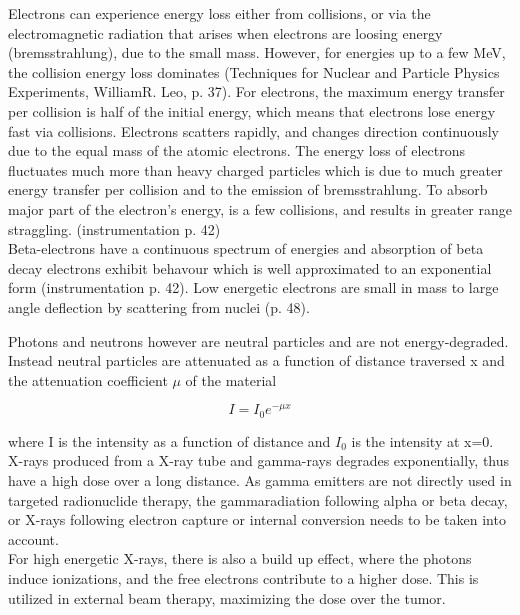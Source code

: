 \documentclass[a4paper,11pt,twoside]{book}
\begin{document}
Electrons can experience energy loss either  from  collisions, or via the electromagnetic radiation that arises when electrons are loosing energy (bremsstrahlung), due to the small mass. However, for energies up to a few MeV, the collision energy loss dominates (Techniques for Nuclear and Particle Physics Experiments, WilliamR. Leo, p.  37). For electrons, the maximum energy transfer per collision is half of the initial energy, which means that electrons lose energy fast via collisions. Electrons scatters rapidly, and changes direction continuously due to the equal mass of the atomic electrons. The energy loss of electrons fluctuates much more than heavy charged particles which is due to much greater energy transfer per collision and to the emission of bremsstrahlung. To absorb major part of the electron's energy, is a few collisions, and results in greater range straggling.  (instrumentation p. 42)\\
 
Beta-electrons have a continuous spectrum of energies and absorption of beta decay electrons exhibit behavour which is well approximated to an exponential form (instrumentation p. 42). 
Low energetic electrons are small in mass to large angle deflection by scattering from nuclei (p. 48). 

Photons and neutrons however are neutral particles and are not energy-degraded. Instead neutral particles are attenuated as a function of distance traversed x and the attenuation coefficient $\mu$ of the material 

\begin{equation}
    I = I_0 e^{-\mu x}
\end{equation}

where I is the intensity as a function of distance and $I_0$ is the intensity at x=0. 
 X-rays produced from a X-ray tube and gamma-rays degrades exponentially, thus have a high dose over a long distance. As gamma emitters are not directly used in targeted  radionuclide therapy, the gammaradiation following alpha or beta decay, or X-rays following electron capture or internal conversion needs to be taken into account.\\
 For high energetic X-rays, there is also a build up effect, where the photons induce ionizations, and the free electrons contribute to a higher dose. This is utilized in external beam therapy, maximizing the dose over the tumor. \\
\end{document}
